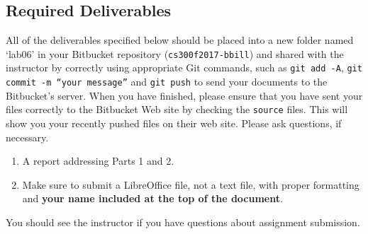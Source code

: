 \vspace*{-.1in}
\subsection*{Required Deliverables}
\vspace*{-.1in}
All of the deliverables specified below should be placed into a new folder named `lab06' in your Bitbucket repository ({\tt cs300f2017-bbill})  and shared with the instructor by correctly using  appropriate Git commands, such as {\tt git add -A}, {\tt git commit -m ``your message''} and {\tt git push} to send your documents to the Bitbucket's server. When you have finished, please ensure that you have sent your files correctly to the Bitbucket Web site by checking the {\tt source} files. This will show you your recently pushed files on their web site. Please ask questions, if necessary.
\color{red}
\begin{enumerate}
	\item A report addressing Parts 1 and 2.
	\item Make sure to submit a LibreOffice file, not a text file, with proper formatting and \textbf{your name included at the top of the document}.
\end{enumerate}
\color{black}

\noindent You should see the instructor if you have questions about assignment submission.




